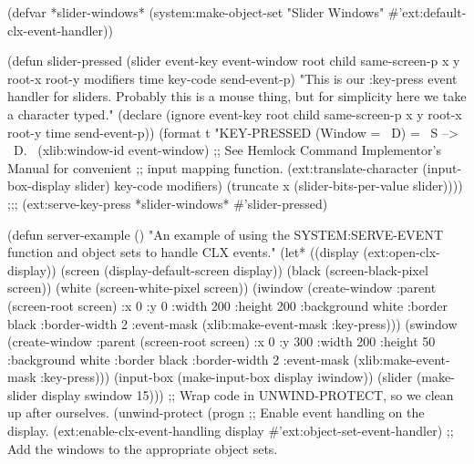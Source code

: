 {\begin{lisp}
(defvar *slider-windows*
        (system:make-object-set "Slider Windows"
                                #'ext:default-clx-event-handler))

(defun slider-pressed (slider event-key event-window root child
                       same-screen-p x y root-x root-y modifiers time
                       key-code send-event-p)
  "This is our :key-press event handler for sliders.  Probably this is
   a mouse thing, but for simplicity here we take a character typed."
  (declare (ignore event-key root child same-screen-p x y
                   root-x root-y time send-event-p))
  (format t "KEY-PRESSED (Window = ~D) = ~S  -->  ~D.~%
          (xlib:window-id event-window)
          ;; See Hemlock Command Implementor's Manual for convenient
          ;; input mapping function.
          (ext:translate-character (input-box-display slider)
                                     key-code modifiers)
          (truncate x (slider-bits-per-value slider))))
;;;
(ext:serve-key-press *slider-windows* #'slider-pressed)
\end{lisp}
\begin{lisp}
(defun server-example ()
  "An example of using the SYSTEM:SERVE-EVENT function and object sets to
   handle CLX events."
  (let* ((display (ext:open-clx-display))
         (screen (display-default-screen display))
         (black (screen-black-pixel screen))
         (white (screen-white-pixel screen))
         (iwindow (create-window :parent (screen-root screen)
                                 :x 0 :y 0 :width 200 :height 200
                                 :background white :border black
                                 :border-width 2
                                 :event-mask
                                 (xlib:make-event-mask :key-press)))
         (swindow (create-window :parent (screen-root screen)
                                 :x 0 :y 300 :width 200 :height 50
                                 :background white :border black
                                 :border-width 2
                                 :event-mask
                                 (xlib:make-event-mask :key-press)))
         (input-box (make-input-box display iwindow))
         (slider (make-slider display swindow 15)))
    ;; Wrap code in UNWIND-PROTECT, so we clean up after ourselves.
    (unwind-protect
        (progn
          ;; Enable event handling on the display.
          (ext:enable-clx-event-handling display
                                         #'ext:object-set-event-handler)
          ;; Add the windows to the appropriate object sets.

\end{lisp}}
